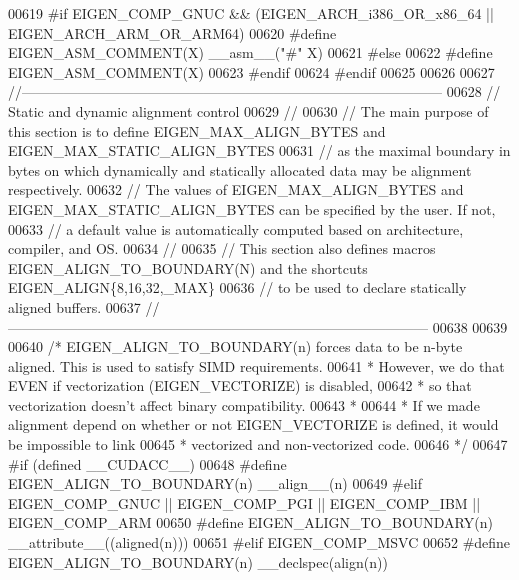 \begin{DoxyCode}
00619 \textcolor{preprocessor}{  #if EIGEN\_COMP\_GNUC && (EIGEN\_ARCH\_i386\_OR\_x86\_64 || EIGEN\_ARCH\_ARM\_OR\_ARM64)}
00620 \textcolor{preprocessor}{    #define EIGEN\_ASM\_COMMENT(X)  \_\_asm\_\_("#" X)}
00621 \textcolor{preprocessor}{  #else}
00622 \textcolor{preprocessor}{    #define EIGEN\_ASM\_COMMENT(X)}
00623 \textcolor{preprocessor}{  #endif}
00624 \textcolor{preprocessor}{#endif}
00625 
00626 
00627 \textcolor{comment}{//------------------------------------------------------------------------------------------}
00628 \textcolor{comment}{// Static and dynamic alignment control}
00629 \textcolor{comment}{//}
00630 \textcolor{comment}{// The main purpose of this section is to define EIGEN\_MAX\_ALIGN\_BYTES and EIGEN\_MAX\_STATIC\_ALIGN\_BYTES}
00631 \textcolor{comment}{// as the maximal boundary in bytes on which dynamically and statically allocated data may be alignment
       respectively.}
00632 \textcolor{comment}{// The values of EIGEN\_MAX\_ALIGN\_BYTES and EIGEN\_MAX\_STATIC\_ALIGN\_BYTES can be specified by the user. If
       not,}
00633 \textcolor{comment}{// a default value is automatically computed based on architecture, compiler, and OS.}
00634 \textcolor{comment}{//}
00635 \textcolor{comment}{// This section also defines macros EIGEN\_ALIGN\_TO\_BOUNDARY(N) and the shortcuts EIGEN\_ALIGN\{8,16,32,\_MAX\}}
00636 \textcolor{comment}{// to be used to declare statically aligned buffers.}
00637 \textcolor{comment}{//------------------------------------------------------------------------------------------}
00638 
00639 
00640 \textcolor{comment}{/* EIGEN\_ALIGN\_TO\_BOUNDARY(n) forces data to be n-byte aligned. This is used to satisfy SIMD requirements.}
00641 \textcolor{comment}{ * However, we do that EVEN if vectorization (EIGEN\_VECTORIZE) is disabled,}
00642 \textcolor{comment}{ * so that vectorization doesn't affect binary compatibility.}
00643 \textcolor{comment}{ *}
00644 \textcolor{comment}{ * If we made alignment depend on whether or not EIGEN\_VECTORIZE is defined, it would be impossible to link}
00645 \textcolor{comment}{ * vectorized and non-vectorized code.}
00646 \textcolor{comment}{ */}
00647 \textcolor{preprocessor}{#if (defined \_\_CUDACC\_\_)}
00648 \textcolor{preprocessor}{  #define EIGEN\_ALIGN\_TO\_BOUNDARY(n) \_\_align\_\_(n)}
00649 \textcolor{preprocessor}{#elif EIGEN\_COMP\_GNUC || EIGEN\_COMP\_PGI || EIGEN\_COMP\_IBM || EIGEN\_COMP\_ARM}
00650 \textcolor{preprocessor}{  #define EIGEN\_ALIGN\_TO\_BOUNDARY(n) \_\_attribute\_\_((aligned(n)))}
00651 \textcolor{preprocessor}{#elif EIGEN\_COMP\_MSVC}
00652 \textcolor{preprocessor}{  #define EIGEN\_ALIGN\_TO\_BOUNDARY(n) \_\_declspec(align(n))}

\end{DoxyCode}

